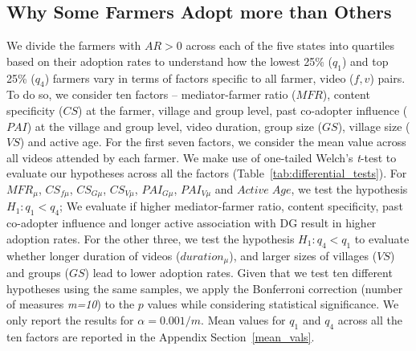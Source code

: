 \documentclass[manuscript,screen]{acmart}
\begin{document}
\subsection{Why Some Farmers Adopt more than Others}\label{differnt_farmers}

We divide the farmers with $AR > 0$ across each of the five states into quartiles based on their adoption rates to understand how the lowest 25\% ($q_{1}$) and top 25\% ($q_{4}$) farmers vary in terms of factors specific to all farmer, video ($f,v$) pairs. To do so, we consider ten factors -- mediator-farmer ratio ($MFR$), content specificity ($CS$) at the farmer, village and group level, past co-adopter influence ($PAI$) at the village and group level, video duration, group size ($GS$), village size ($VS$) and active age. For the first seven factors, we consider the mean value across all videos attended by each farmer. We make use of one-tailed Welch's \textit{t}-test to evaluate our hypotheses across all the factors (Table~\ref{tab:differential_tests}). For $MFR_{\mu}$, $CS_{f\mu}$, $CS_{G\mu}$, $CS_{V\mu}$, $PAI_{G\mu}$, $PAI_{V\mu}$ and $Active\;Age$, we test the hypothesis $H_{1}: q_{1} < q_{4}$; We evaluate if higher mediator-farmer ratio, content specificity, past co-adopter influence and longer active association with DG result in higher adoption rates. For the other three, we test the hypothesis $H_{1}: q_{4} < q_{1}$ to evaluate whether longer duration of videos ($duration_{\mu}$), and larger sizes of villages ($VS$) and groups ($GS$) lead to lower adoption rates. Given that we test ten different hypotheses using the same samples, we apply the Bonferroni correction (number of measures \textit{m=10}) to the $p$ values while considering statistical significance. We only report the results for $\alpha = 0.001/m$. Mean values for $q_{1}$ and $q_{4}$ across all the ten factors are reported in the Appendix Section~\ref{mean_vals}.
\end{document}
